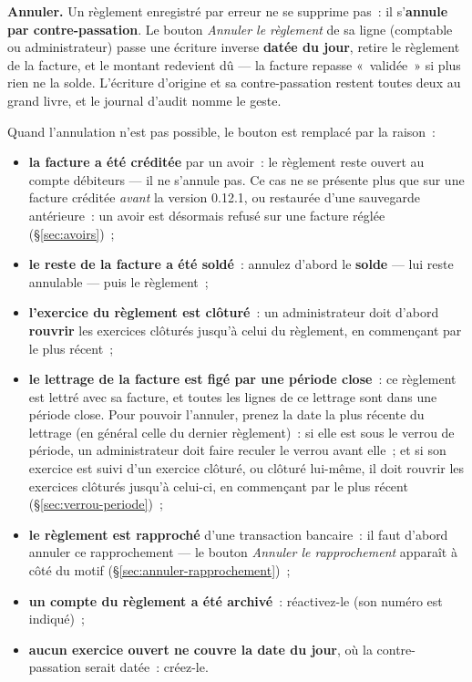 \documentclass[a4paper,11pt,oneside]{article}
\begin{document}
\textbf{Annuler.} Un règlement enregistré par erreur ne se supprime pas~: il s'\textbf{annule par
contre-passation}. Le bouton \emph{Annuler le règlement} de sa ligne (comptable ou
administrateur) passe une écriture inverse \textbf{datée du jour}, retire le règlement de la
facture, et le montant redevient dû --- la facture repasse «~validée~» si plus rien ne la solde.
L'écriture d'origine et sa contre-passation restent toutes deux au grand livre, et le journal
d'audit nomme le geste.

Quand l'annulation n'est pas possible, le bouton est remplacé par la raison~:

\begin{itemize}
    \item \textbf{la facture a été créditée} par un avoir~: le règlement reste ouvert au compte
          débiteurs --- il ne s'annule pas. Ce cas ne se présente plus
          que sur une facture créditée \emph{avant} la version 0.12.1, ou restaurée d'une sauvegarde
          antérieure~: un avoir est désormais refusé sur une facture réglée (\S\ref{sec:avoirs})~;
    \item \textbf{le reste de la facture a été soldé}~: annulez d'abord le \textbf{solde} --- lui
          reste annulable --- puis le règlement~;
    \item \textbf{l'exercice du règlement est clôturé}~: un administrateur doit
          d'abord \textbf{rouvrir} les exercices clôturés jusqu'à celui du règlement, en
          commençant par le plus récent~;
    \item \textbf{le lettrage de la facture est figé par une période close}~: ce règlement est
          lettré avec sa facture, et toutes les lignes de ce lettrage sont dans une période
          close. Pour pouvoir l'annuler, prenez la date la plus récente du lettrage (en général
          celle du dernier règlement)~: si elle est sous le verrou de période, un administrateur
          doit faire reculer le verrou avant elle~; et si son exercice est suivi d'un exercice
          clôturé, ou clôturé lui-même, il doit rouvrir les exercices clôturés jusqu'à
          celui-ci, en commençant par le plus récent (\S\ref{sec:verrou-periode})~;
    \item \textbf{le règlement est rapproché} d'une transaction bancaire~: il faut d'abord
          annuler ce rapprochement --- le bouton \emph{Annuler le rapprochement} apparaît à
          côté du motif (\S\ref{sec:annuler-rapprochement})~;
    \item \textbf{un compte du règlement a été archivé}~: réactivez-le (son numéro est indiqué)~;
    \item \textbf{aucun exercice ouvert ne couvre la date du jour}, où la contre-passation serait
          datée~: créez-le.
\end{itemize}
\end{document}
